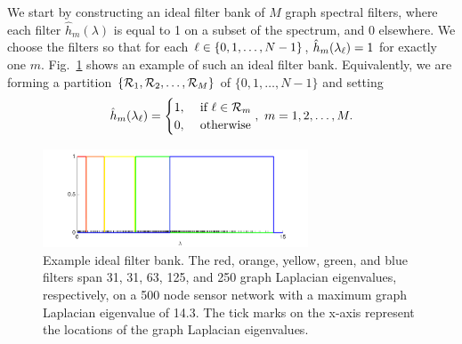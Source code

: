 \documentclass{article}
\begin{document}
We start by 
constructing an ideal filter bank of $M$ graph spectral filters, where each filter $\hat{h}_m(\lambda)$ is equal to 1 on a subset of the spectrum, and 0 elsewhere. We choose the filters so that for each $\ell \in \{0,1,\ldots,N-1\}$, $\hat{h}_m(\lambda_\ell)=1$ for exactly one $m$. Fig.\ \ref{Fig:fb} shows an example of such an ideal filter bank. Equivalently, we are forming a partition $\{{\cal R}_1,{\cal R}_2,\ldots,{\cal R}_M\}$ of $\{0,1,\ldots,N-1\}$ and setting 
$$
\hat{h}_m(\lambda_\ell)=
\begin{cases}
1,&\hbox{ if } \ell \in {\cal R}_m \\
0,&\hbox{ otherwise}
\end{cases},~m=1,2,\ldots,M.
$$
\begin{figure}[t]
\centerline{\includegraphics[width=3.1in]{fig_filter_bank}}
\caption{Example ideal filter bank. The red, orange, yellow, green, and blue filters span 31, 31, 63, 125, and 250 graph Laplacian eigenvalues, respectively, on a 500 node sensor network with %
a maximum graph Laplacian eigenvalue of 14.3. The tick marks on the x-axis represent the locations of the graph Laplacian eigenvalues.}\label{Fig:fb}
\end{figure}
\end{document}
